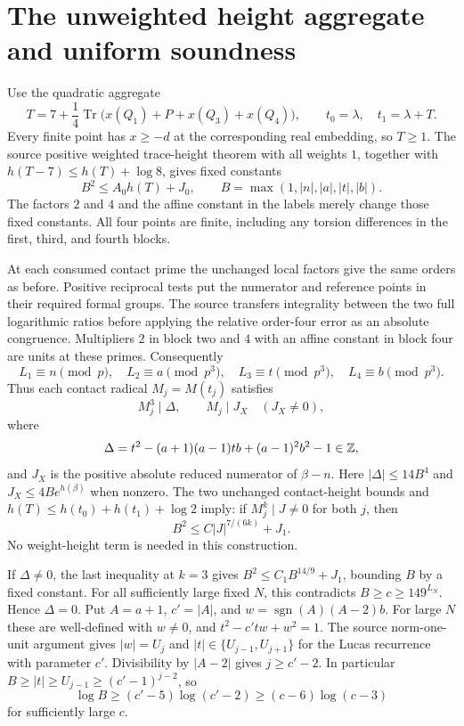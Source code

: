 \documentclass[11pt]{article}
\DeclareMathOperator{\Tr}{Tr}\DeclareMathOperator{\Nm}{Nm}
\begin{document}
\section*{The unweighted height aggregate and uniform soundness}
Use the quadratic aggregate
\[
 T=7+\frac14\Tr\bigl(x(Q_1)+P+x(Q_3)+x(Q_4)\bigr),
 \qquad t_0=\lambda,\quad t_1=\lambda+T.
\]
Every finite point has $x\ge-d$ at the corresponding real embedding,
so $T\ge1$. The source positive weighted trace-height theorem with all
weights $1$, together with $h(T-7)\le h(T)+\log8$, gives fixed constants
\[
 B^2\le A_0h(T)+J_0,\qquad
 B=\max(1,|n|,|a|,|t|,|b|).
\]
The factors $2$ and $4$ and the affine constant in the labels merely
change those fixed constants. All four points are finite, including any
torsion differences in the first, third, and fourth blocks.

At each consumed contact prime the unchanged local factors give the
same orders as before. Positive reciprocal tests put the numerator and
reference points in their required formal groups. The source transfers
integrality between the two full logarithmic ratios before applying
the relative order-four error as an absolute congruence. Multipliers
$2$ in block two and $4$ with an affine constant in block four are units
at these primes. Consequently
\[
 L_1\equiv n\pmod p,\quad L_2\equiv a\pmod{p^3},\quad
 L_3\equiv t\pmod{p^3},\quad L_4\equiv b\pmod{p^3}.
\]
Thus each contact radical $M_j=M(t_j)$ satisfies
\[
 M_j^3\mid\Delta,\qquad M_j\mid J_X\quad(J_X\ne0),
\]
where
\[
 \Delta=t^2-(a+1)(a-1)tb+(a-1)^2b^2-1\in\mathbb Z,
\]
and $J_X$ is the positive absolute reduced numerator of $\beta-n$.
Here $|\Delta|\le14B^4$ and $J_X\le4B e^{h(\beta)}$ when nonzero.
The two unchanged contact-height bounds and
$h(T)\le h(t_0)+h(t_1)+\log2$ imply: if $M_j^k\mid J\ne0$ for both
$j$, then
\[
                      B^2\le C|J|^{7/(6k)}+J_1.
\]
No weight-height term is needed in this construction.

If $\Delta\ne0$, the last inequality at $k=3$ gives
$B^2\le C_1B^{14/9}+J_1$, bounding $B$ by a fixed constant.
For all sufficiently large fixed $N$, this contradicts
$B\ge c\ge149^{L_N}$. Hence $\Delta=0$.
Put $A=a+1$, $c'=|A|$, and $w=\operatorname{sgn}(A)(A-2)b$.
For large $N$ these are well-defined with $w\ne0$, and
$t^2-c'tw+w^2=1$. The source norm-one-unit argument gives
$|w|=U_j$ and $|t|\in\{U_{j-1},U_{j+1}\}$ for the Lucas recurrence
with parameter $c'$. Divisibility by $|A-2|$ gives $j\ge c'-2$.
In particular $B\ge|t|\ge U_{j-1}\ge(c'-1)^{j-2}$, so
\[
             \log B\ge(c'-5)\log(c'-2)
                     \ge(c-6)\log(c-3)
\]
for sufficiently large $c$.
\end{document}
